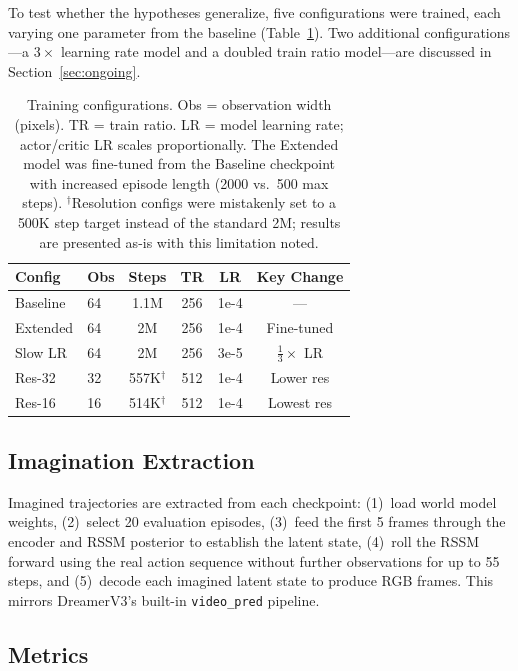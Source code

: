 \documentclass[letterpaper]{article}
\begin{document}
To test whether the hypotheses generalize, five configurations were trained, each varying one parameter from the baseline (Table~\ref{tab:configs}). Two additional configurations---a $3\times$ learning rate model and a doubled train ratio model---are discussed in Section~\ref{sec:ongoing}.

\begin{table}[h]
\centering
\small
\begin{tabular}{llcccc}
\toprule
\textbf{Config} & \textbf{Obs} & \textbf{Steps} & \textbf{TR} & \textbf{LR} & \textbf{Key Change} \\
\midrule
Baseline    & 64    & 1.1M & 256 & 1e-4 & --- \\
Extended    & 64    & 2M   & 256 & 1e-4 & Fine-tuned \\
Slow LR     & 64    & 2M   & 256 & 3e-5 & $\frac{1}{3}\times$ LR \\
Res-32      & 32    & 557K$^\dagger$ & 512 & 1e-4 & Lower res \\
Res-16      & 16    & 514K$^\dagger$ & 512 & 1e-4 & Lowest res \\
\bottomrule
\end{tabular}
\caption{Training configurations. Obs = observation width (pixels). TR = train ratio. LR = model learning rate; actor/critic LR scales proportionally. The Extended model was fine-tuned from the Baseline checkpoint with increased episode length (2000 vs.\ 500 max steps). $^\dagger$Resolution configs were mistakenly set to a 500K step target instead of the standard 2M; results are presented as-is with this limitation noted.}
\label{tab:configs}
\end{table}

\subsection{Imagination Extraction}

Imagined trajectories are extracted from each checkpoint: (1)~load world model weights, (2)~select 20 evaluation episodes, (3)~feed the first 5 frames through the encoder and RSSM posterior to establish the latent state, (4)~roll the RSSM forward using the real action sequence without further observations for up to 55 steps, and (5)~decode each imagined latent state to produce RGB frames. This mirrors DreamerV3's built-in \texttt{video\_pred} pipeline.

\subsection{Metrics}
\end{document}
